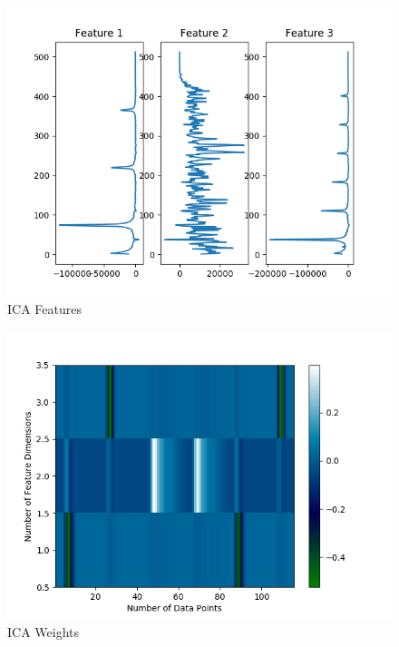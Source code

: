 \documentclass{article}[12pt]
\begin{document}
   
   \begin{figure}[ht]
   \centerline{
   \includegraphics[scale=1.0]{p1/ica_features_sound.png}}
   \caption{ICA Features}
   \label{fig:ica_f}
   \end{figure}
   
   \begin{figure}[ht]
   \centerline{
   \includegraphics[scale=1.0]{p1/ica_weights_sound.png}}
   \caption{ICA Weights}
   \label{fig:ica_w}
   \end{figure}
   
\end{document}
